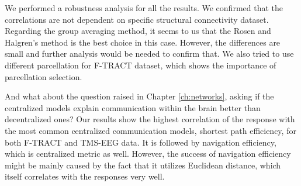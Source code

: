 We performed a robustness analysis for all the results. We confirmed that the correlations are not dependent on specific structural connectivity dataset. Regarding the group averaging method, it seems to us that the Rosen and Halgren's method is the best choice in this case. However, the differences are small and further analysis would be needed to confirm that. We also tried to use different parcellation for F-TRACT dataset, which shows the importance of parcellation selection.

And what about the question raised in Chapter \ref{ch:networks}, asking if the centralized models
explain communication within the brain better than decentralized ones? Our results show the highest correlation of the response with the most common centralized communication models, shortest path efficiency, for both F-TRACT and TMS-EEG data. It is followed by navigation efficiency, which is centralized metric as well. However, the success of navigation efficiency might be mainly caused by the fact that it utilizes Euclidean distance, which itself correlates with the responses very well.

